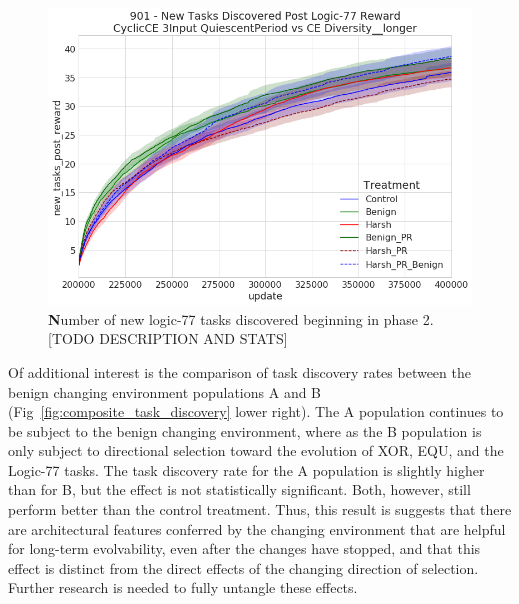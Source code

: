\documentclass[PhD]{msu-thesis}
\begin{document}
\begin{figure}[!h]
\includegraphics[trim={0 0 0 0}, clip, width=0.75\columnwidth]{figures/CE/901_postreward_all_task_discovery.png}
\caption{{\textbf Number of new logic-77 tasks discovered beginning in phase 2}. [TODO DESCRIPTION AND STATS]%
}
\label{fig:postreward_task_discovery}
\end{figure}

Of additional interest is the comparison of task discovery rates between the benign changing environment populations A and B (Fig~\ref{fig:composite_task_discovery} lower right). The A population continues to be subject to the benign changing environment, where as the B population is only subject to directional selection toward the evolution of XOR, EQU, and the Logic-77 tasks. The task discovery rate for the A population is slightly higher than for B, but the effect is not statistically significant. Both, however, still perform better than the control treatment. Thus, this result is suggests that there are architectural features conferred by the changing environment that are helpful for long-term evolvability, even after the changes have stopped, and that this effect is distinct from the direct effects of the changing direction of selection. Further research is needed to fully untangle these effects.
\end{document}
